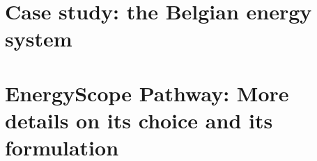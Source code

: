 \documentclass[a4paper,twoside,10pt,final]{memoir} %
\begin{document}






\begin{appendices}

\chapter{Case study: the Belgian energy system}
\label{app:case_study}


\chapter{EnergyScope Pathway: More details on its choice and its formulation}
\label{app:EnergyScope}


\end{appendices}
\end{document}

